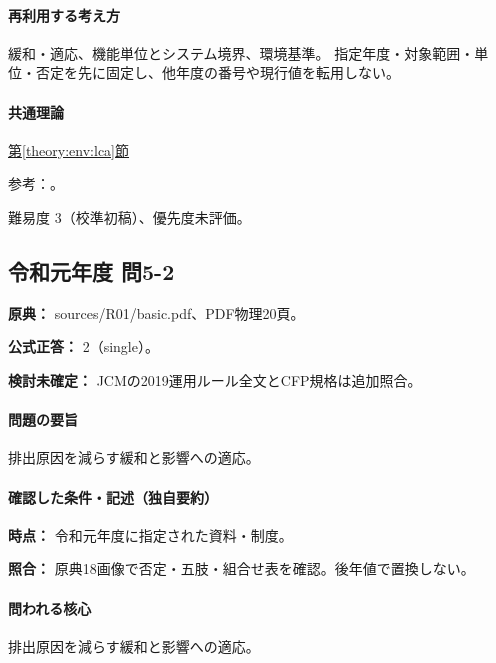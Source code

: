 \paragraph{再利用する考え方} 緩和・適応、機能単位とシステム境界、環境基準。 指定年度・対象範囲・単位・否定を先に固定し、他年度の番号や現行値を転用しない。

\paragraph{共通理論} \hyperref[theory:env:lca]{第\ref*{theory:env:lca}節}

\par 参考：\cite{env58_pmstandard}。

\par 難易度 3（校準初稿）、優先度未評価。

\subsection{令和元年度 問5-2}
\label{q:r01-reg-basic-5-2}

\noindent\textbf{原典：} sources/R01/basic.pdf、PDF物理20頁。

\textbf{公式正答：} 2（single）。

\par\textbf{検討未確定：} JCMの2019運用ルール全文とCFP規格は追加照合。

\paragraph{問題の要旨} 排出原因を減らす緩和と影響への適応。

\paragraph{確認した条件・記述（独自要約）}\mbox{}\par

\noindent\textbf{時点：} 令和元年度に指定された資料・制度。\par

\noindent\textbf{照合：} 原典18画像で否定・五肢・組合せ表を確認。後年値で置換しない。\par

\paragraph{問われる核心} 排出原因を減らす緩和と影響への適応。

